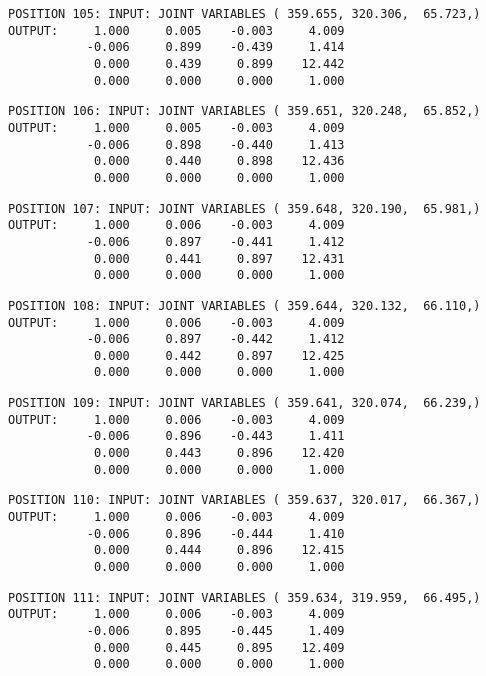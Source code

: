 \begin{verbatim}
POSITION 105: INPUT: JOINT VARIABLES ( 359.655, 320.306,  65.723,)
OUTPUT:     1.000     0.005    -0.003     4.009
           -0.006     0.899    -0.439     1.414
            0.000     0.439     0.899    12.442
            0.000     0.000     0.000     1.000
\end{verbatim} \pagebreak[1]\begin{verbatim}
POSITION 106: INPUT: JOINT VARIABLES ( 359.651, 320.248,  65.852,)
OUTPUT:     1.000     0.005    -0.003     4.009
           -0.006     0.898    -0.440     1.413
            0.000     0.440     0.898    12.436
            0.000     0.000     0.000     1.000
\end{verbatim} \pagebreak[1]\begin{verbatim}
POSITION 107: INPUT: JOINT VARIABLES ( 359.648, 320.190,  65.981,)
OUTPUT:     1.000     0.006    -0.003     4.009
           -0.006     0.897    -0.441     1.412
            0.000     0.441     0.897    12.431
            0.000     0.000     0.000     1.000
\end{verbatim} \pagebreak[1]\begin{verbatim}
POSITION 108: INPUT: JOINT VARIABLES ( 359.644, 320.132,  66.110,)
OUTPUT:     1.000     0.006    -0.003     4.009
           -0.006     0.897    -0.442     1.412
            0.000     0.442     0.897    12.425
            0.000     0.000     0.000     1.000
\end{verbatim} \pagebreak[1]\begin{verbatim}
POSITION 109: INPUT: JOINT VARIABLES ( 359.641, 320.074,  66.239,)
OUTPUT:     1.000     0.006    -0.003     4.009
           -0.006     0.896    -0.443     1.411
            0.000     0.443     0.896    12.420
            0.000     0.000     0.000     1.000
\end{verbatim} \pagebreak[1]\begin{verbatim}
POSITION 110: INPUT: JOINT VARIABLES ( 359.637, 320.017,  66.367,)
OUTPUT:     1.000     0.006    -0.003     4.009
           -0.006     0.896    -0.444     1.410
            0.000     0.444     0.896    12.415
            0.000     0.000     0.000     1.000
\end{verbatim} \pagebreak[1]\begin{verbatim}
POSITION 111: INPUT: JOINT VARIABLES ( 359.634, 319.959,  66.495,)
OUTPUT:     1.000     0.006    -0.003     4.009
           -0.006     0.895    -0.445     1.409
            0.000     0.445     0.895    12.409
            0.000     0.000     0.000     1.000
\end{verbatim} \pagebreak[1]\begin{verbatim}

\end{verbatim}
